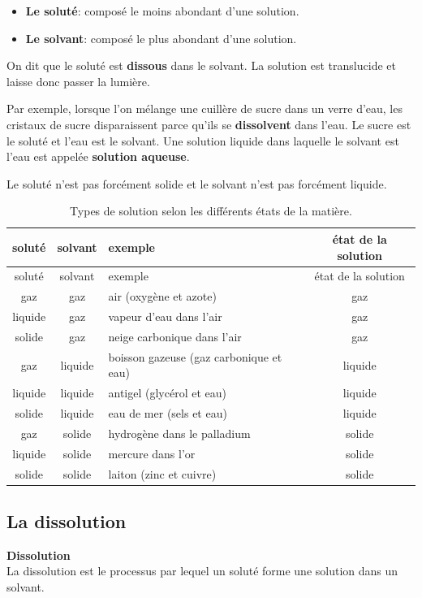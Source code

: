 \documentclass[
  11pt,
  french,
  a4paper,
  openany]{book}
\providecommand{\tightlist}{%
  \setlength{\itemsep}{0pt}\setlength{\parskip}{0pt}}
\begin{document}
\begin{itemize}
\tightlist
\item
  \textbf{Le soluté}: composé le moins abondant d'une solution.
\item
  \textbf{Le solvant}: composé le plus abondant d'une solution.
\end{itemize}

On dit que le soluté est \textbf{dissous} dans le solvant. La solution est translucide et laisse donc passer la lumière.

Par exemple, lorsque l'on mélange une cuillère de sucre dans un verre d'eau, les cristaux de sucre disparaissent parce qu'ils se \textbf{dissolvent} dans l'eau. Le sucre est le soluté et l'eau est le solvant. Une solution liquide dans laquelle le solvant est l'eau est appelée \textbf{solution aqueuse}.

Le soluté n'est pas forcément solide et le solvant n'est pas forcément liquide.

\newpage

\begin{longtable}[]{@{}cclc@{}}
\caption{\label{tab:types-solution-etats-matiere} Types de solution selon les différents états de la matière.}\tabularnewline
\toprule
soluté & solvant & exemple & état de la solution\tabularnewline
\midrule
\endfirsthead
\toprule
soluté & solvant & exemple & état de la solution\tabularnewline
\midrule
\endhead
gaz & gaz & air (oxygène et azote) & gaz\tabularnewline
liquide & gaz & vapeur d'eau dans l'air & gaz\tabularnewline
solide & gaz & neige carbonique dans l'air & gaz\tabularnewline
gaz & liquide & boisson gazeuse (gaz carbonique et eau) & liquide\tabularnewline
liquide & liquide & antigel (glycérol et eau) & liquide\tabularnewline
solide & liquide & eau de mer (sels et eau) & liquide\tabularnewline
gaz & solide & hydrogène dans le palladium & solide\tabularnewline
liquide & solide & mercure dans l'or & solide\tabularnewline
solide & solide & laiton (zinc et cuivre) & solide\tabularnewline
\bottomrule
\end{longtable}

\hypertarget{la-dissolution}{%
\subsection{La dissolution}\label{la-dissolution}}

\begin{tcolorbox}
\textbf{Dissolution}\\
La dissolution est le processus par lequel un soluté forme une solution dans un solvant.

\end{tcolorbox}
\end{document}
